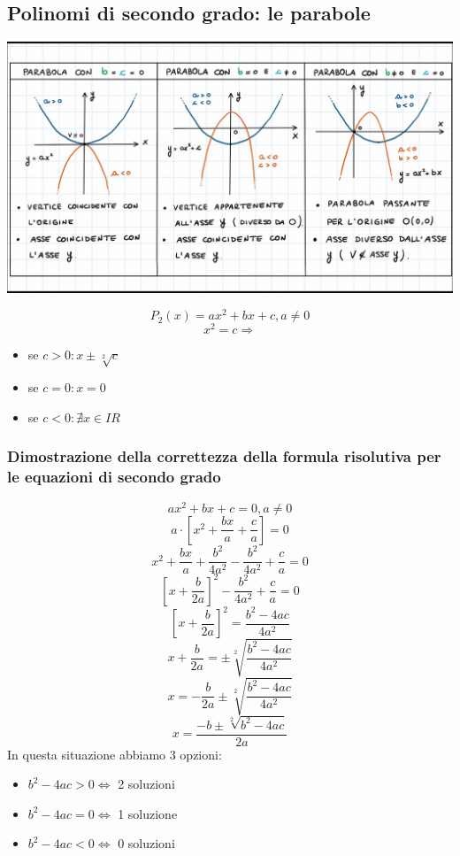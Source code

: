 \documentclass{report}
\begin{document}
    \subsection{Polinomi di secondo grado: le parabole}
        \begin{center}
            \includegraphics[width=\textwidth]{parabola.jpg}
        \end{center}
        $$ P_2(x) = ax^2 + bx + c, a \neq 0 $$
        $$ x^2 = c \Longrightarrow $$
        \begin{itemize}
            \item se $c > 0: x \pm \sqrt[2]{c} $
            \item se $c = 0: x = 0 $
            \item se $c < 0: \nexists x \in I\!R $
        \end{itemize}
        \subsubsection{Dimostrazione della correttezza della formula risolutiva per le equazioni di secondo grado}
            $$ ax^2 + bx + c = 0, a \neq 0 $$
            $$ a \cdot \left[ x^2 + \frac{bx}{a} + \frac{c}{a} \right] = 0 $$
            $$ x^2 + \frac{bx}{a} + \frac{b^2}{4a^2} - \frac{b^2}{4a^2} + \frac{c}{a} = 0 $$
            $$ \left[ x + \frac{b}{2a} \right]^2 - \frac{b^2}{4a^2} + \frac{c}{a} = 0 $$
            $$ \left[ x + \frac{b}{2a} \right]^2 = \frac{b^2 - 4ac}{4a^2} $$
            $$ x + \frac{b}{2a} = \pm \sqrt[2]{\frac{b^2 - 4ac}{4a^2}} $$
            $$ x = -\frac{b}{2a} \pm \sqrt[2]{\frac{b^2 - 4ac}{4a^2}} $$
            $$ x = \frac{-b \pm \sqrt[2]{b^2 - 4ac}}{2a} $$
            In questa situazione abbiamo 3 opzioni:
            \begin{itemize}
                \item $b^2 - 4ac > 0 \Longleftrightarrow $ 2 soluzioni
                \item $b^2 -4ac = 0 \Longleftrightarrow $ 1 soluzione
                \item $b^2 - 4ac < 0 \Longleftrightarrow $ 0 soluzioni
            \end{itemize}
\end{document}

